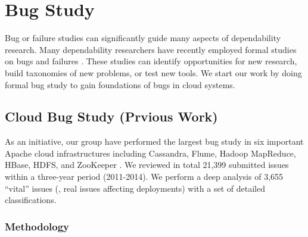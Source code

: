 \section{Bug Study}

Bug or failure studies can significantly guide many aspects of dependability
research. Many dependability researchers have recently employed formal studies
on bugs and failures \cite{Guo+13-CureIsWorse, Li+13-ScopeBugStudy}. These
studies can identify opportunities for new research, build taxonomies of new
problems, or test new tools. We start our work by doing formal bug study to gain
foundations of bugs in cloud systems.

\subsection{Cloud Bug Study (Prvious Work)}

As an initiative, our group have performed the largest bug study in six
important Apache cloud infrastructures including Cassandra, Flume, Hadoop
MapReduce, HBase, HDFS, and ZooKeeper \cite{Gunawi+14-Cbs}. We reviewed in total
21,399 submitted issues within a three-year period (2011-2014).  We perform a
deep analysis of 3,655 ``vital'' issues (\ie, real issues affecting deployments)
with a set of detailed classifications.  \subsubsection{Methodology}



